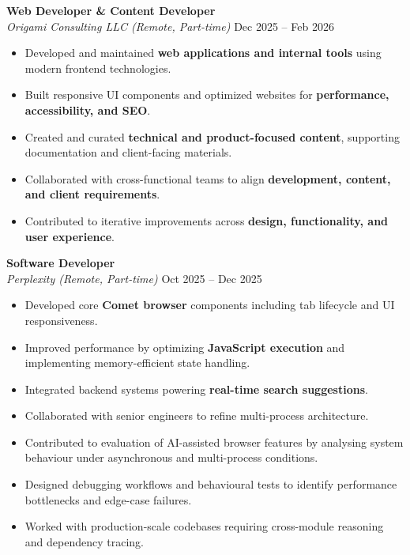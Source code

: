 \documentclass[a4paper,10pt]{article}
\begin{document}
\textbf{Web Developer \& Content Developer}\\
\emph{Origami Consulting LLC (Remote, Part-time)} \hfill Dec 2025 -- Feb 2026
\begin{itemize}[leftmargin=*]
    \item Developed and maintained \textbf{web applications and internal tools} using modern frontend technologies.
    \item Built responsive UI components and optimized websites for \textbf{performance, accessibility, and SEO}.
    \item Created and curated \textbf{technical and product-focused content}, supporting documentation and client-facing materials.
    \item Collaborated with cross-functional teams to align \textbf{development, content, and client requirements}.
    \item Contributed to iterative improvements across \textbf{design, functionality, and user experience}.

\end{itemize}

\textbf{Software Developer}\\
\emph{Perplexity (Remote, Part-time)} \hfill Oct 2025 -- Dec 2025
\begin{itemize}[leftmargin=*]
    \item Developed core \textbf{Comet browser} components including tab lifecycle and UI responsiveness.
    \item Improved performance by optimizing \textbf{JavaScript execution} and implementing memory-efficient state handling.
    \item Integrated backend systems powering \textbf{real-time search suggestions}.
    \item Collaborated with senior engineers to refine multi-process architecture.
    \item Contributed to evaluation of AI-assisted browser features by analysing system behaviour under asynchronous and multi-process conditions.
    \item Designed debugging workflows and behavioural tests to identify performance bottlenecks and edge-case failures.
    \item Worked with production-scale codebases requiring cross-module reasoning and dependency tracing.
\end{itemize}
\end{document}
